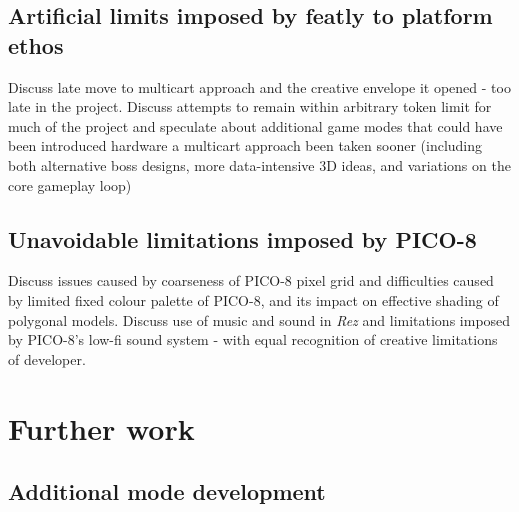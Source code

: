 \documentclass{article}
\begin{document}
\subsection{Artificial limits imposed by featly to platform ethos}
Discuss late move to multicart approach and the creative envelope it opened - too late
in the project. Discuss attempts to remain within arbitrary token limit for much of the
project and speculate about additional game modes that could have been introduced hardware
a multicart approach been taken sooner (including both alternative boss designs, more
data-intensive 3D ideas, and variations on the core gameplay loop)
\subsection{Unavoidable limitations imposed by PICO-8}
Discuss issues caused by coarseness of PICO-8 pixel grid and difficulties caused by
limited fixed colour palette of PICO-8, and its impact on effective shading of polygonal
models. Discuss use of music and sound in \textit{Rez} and limitations imposed by PICO-8's
low-fi sound system - with equal recognition of creative limitations of developer.


\section{Further work}
\subsection{Additional mode development}
\end{document}
